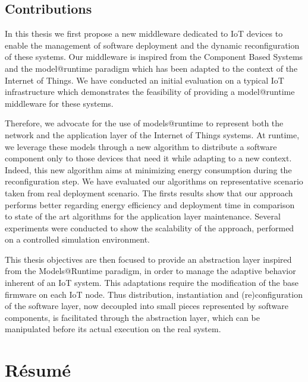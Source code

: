 \section{Contributions}
In this thesis we first propose a new middleware dedicated to IoT devices to enable the management of software deployment and the dynamic reconfiguration of these systems.
Our middleware is inspired from the Component Based Systems and the model@runtime paradigm which has been adapted to the context of the Internet of Things.
We have conducted an initial evaluation on a typical IoT infrastructure which demonstrates the feasibility of providing a model@runtime middleware for these systems.

Therefore, we advocate for the use of models@runtime to represent both the network and the application layer of the Internet of Things systems.
At runtime, we leverage these models through a new algorithm to distribute a software component only to those devices that need it while adapting to a new context.
Indeed, this new algorithm aims at minimizing energy consumption during the reconfiguration step.
We have evaluated our algorithms on representative scenario taken from real deployment scenario.
The firsts results show that our approach performs better regarding energy efficiency and deployment time in comparison to state of the art algorithms for the application layer maintenance.
Several experiments were conducted to show the scalability of the approach, performed on a controlled simulation environment.

This thesis objectives are then focused to provide an abstraction layer inspired from the Models@Runtime paradigm, in order to manage the adaptive behavior inherent of an IoT system.
This adaptations require the modification of the base firmware on each IoT node.
Thus distribution, instantiation and (re)configuration of the software layer, now decoupled into small pieces represented by software components, is facilitated through the abstraction layer, which can be manipulated before its actual execution on the real system.

\chapter*{Résumé}
